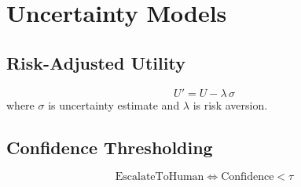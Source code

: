 \section*{Uncertainty Models}

\subsection*{Risk-Adjusted Utility}
\[
U' = U - \lambda\,\sigma
\]
where $\sigma$ is uncertainty estimate and $\lambda$ is risk aversion.

\subsection*{Confidence Thresholding}
\[
\text{EscalateToHuman} \iff \text{Confidence}<\tau
\]
